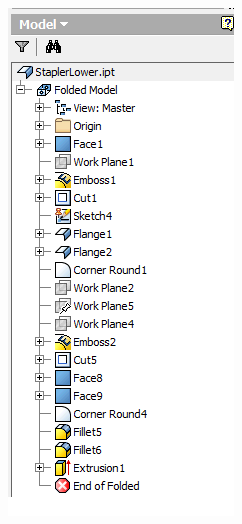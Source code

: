 \begin{minipage}{\linewidth}
\begin{minipage}[c]{0.3\linewidth}
\includegraphics[width=\linewidth,valign=t]{images/StaplerLower_1_tree}
 \label{fig:results:staplerlowermodeltree}
\end{minipage}
\end{minipage}


